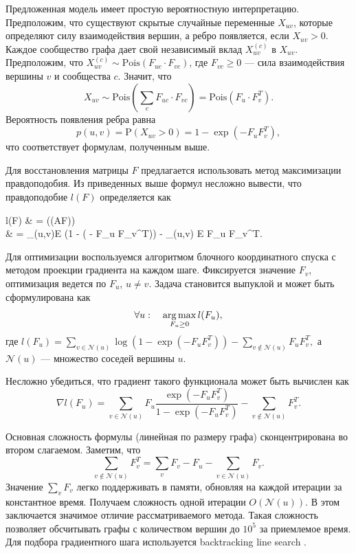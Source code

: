 \documentclass{ITaSconf}
\newcommand{\argmax}{\mathop{\rm arg\,max}\limits}
\def\PP{\mathrm{P}}
\begin{document}
	Предложенная модель имеет простую вероятностную интерпретацию.
	Предположим, что существуют скрытые случайные переменные $X_{uv}$, которые определяют силу взаимодействия вершин, а ребро появляется, если $X_{uv} > 0$.
	Каждое сообщество графа дает свой независимый вклад $X_{uv}^{(c)}$ в $X_{uv}$.
	Предположим, что $X_{uv}^{(c)} \sim \mathrm{Pois}(F_{uc} \cdot F_{vc})$, где $F_{vc}\ge 0$ --- сила взаимодействия вершины $v$ и сообщества $c$.
	Значит, что 
	$$X_{uv} \sim \mathrm{Pois}(\sum_{c} F_{uc} \cdot F_{vc}) = \mathrm{Pois}(F_{u} \cdot F_{v}^T).$$
	Вероятность появления ребра равна 
	$$p(u,v) = \PP(X_{uv} > 0) = 1 - \exp( - F_{u} F_{v}^T),$$
	что соответствует формулам, полученным выше.
	
	Для восстановления матрицы $F$ предлагается использовать метод максимизации правдоподобия.
	Из приведенных выше формул несложно вывести, что правдоподобие $l(F)$ определяется как
	\begin{flalign*}
	l(F) & = \log(\PP(A\mid F)) \\
	& = \sum_{(u,v)\in E} \log(1 - \exp( - F_{u} F_{v}^T)) - \sum_{(u,v) \notin E} F_u F_v^T.
	\end{flalign*}
	
	Для оптимизации воспользуемся алгоритмом блочного координатного спуска с методом проекции градиента на каждом шаге.
	Фиксируется значение $F_v$, оптимизация ведется по $F_u$, $u \ne v$.
	Задача становится выпуклой и может быть сформулирована как
	$$\forall u: \quad \argmax_{F_u \ge 0} l(F_u), $$
	где 
	$\displaystyle l(F_u) = \sum_{v \in \mathcal{N}(u)} \log(1-\exp(-F_u F_v^T)) - \sum_{v \notin \mathcal{N}(u)} F_u F_v^T, $
	а $\mathcal{N}(u)$ — множество соседей вершины $u$.
	
	Несложно убедиться, что градиент такого функционала может быть вычислен как
	$$\nabla l(F_u) = \sum_{v \in \mathcal{N}(u)} F_u \dfrac{\exp(-F_u F_v^T)}{1-\exp(-F_u F_v^T)} - \sum_{v \notin \mathcal{N}(u)} F_v^T.$$
	
	Основная сложность формулы (линейная по размеру графа) сконцентрирована во втором слагаемом.
	Заметим, что 
	$$\sum_{v \notin \mathcal{N}(u)} F_v^T = \sum_v{F_v} - F_u - \sum_{v\in \mathcal{N}(u)} F_v.$$ 
	Значение $\sum_v{F_v}$ легко поддерживать в памяти, обновляя на каждой итерации за константное время.
	Получаем сложность одной итерации $O(\mathcal{N}(u))$.
	В этом заключается значимое отличие рассматриваемого метода.
	Такая сложность позволяет обсчитывать графы с количеством вершин до $10^5$ за приемлемое время.
	Для подбора градиентного шага используется backtracking line search \cite{boyd2004convex}.
	
\end{document}
